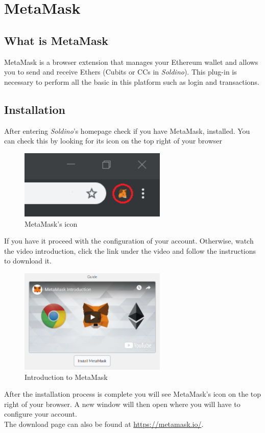 \section{MetaMask}
	\subsection{What is MetaMask}
	MetaMask is a browser extension that manages your Ethereum wallet and 
	allows you to send and receive Ethers (Cubits or CCs in \textit{Soldino}). 
	This plug-in is necessary to perform all the basic in this platform
	such as login and transactions. 
	\subsection{Installation}
	After entering \textit{Soldino}'s homepage check if you have MetaMask, 
	installed. You can check this by looking for its icon on the top right of 
	your browser
	\begin{figure}[H]
		\includegraphics[width=7cm]{res/images/metamask_icon.png}
		\centering
		\caption{MetaMask's icon}
	\end{figure}
	\noindent If you have it proceed with the configuration of your account.
	Otherwise, watch the video introduction, click the link under the video and 
	follow the instructions to download it. 
	\begin{figure}[H]
		\includegraphics[width=7cm]{res/images/metamask_download.png}
		\centering
		\caption{Introduction to MetaMask}
	\end{figure}
	\noindent After the installation process is 
	complete you will see MetaMask's icon on the top right of your browser. A 
	new window will then open where you will have to configure your account.\\
	The download page can also be found at \url{https://metamask.io/}.

